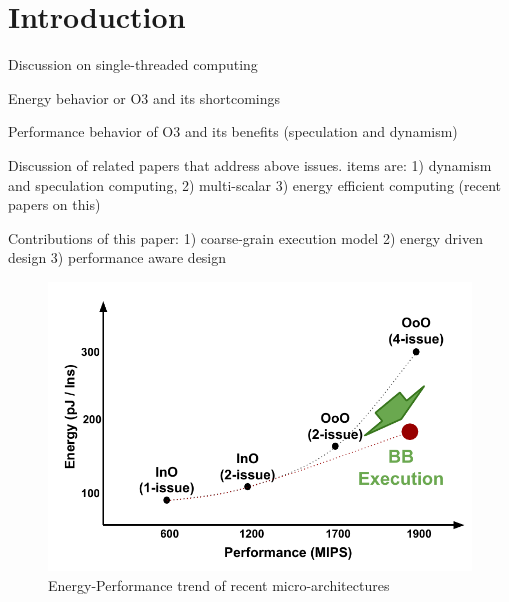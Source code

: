 \section{Introduction} 
\label{sec:intro}

Discussion on single-threaded computing

Energy behavior or O3 and its shortcomings

Performance behavior of O3 and its benefits (speculation and dynamism)

Discussion of related papers that address above issues. items are: 
1) dynamism and speculation computing,
2) multi-scalar
3) energy efficient computing (recent papers on this)

Contributions of this paper: 
1) coarse-grain execution model
2) energy driven design
3) performance aware design


\begin{figure}[h]
	\centering
	\includegraphics[width=1.0\columnwidth]{fig/energy_perf_insight.pdf} 
	\caption{Energy-Performance trend of recent micro-architectures}
	\label{fig:insight}
\end{figure}


